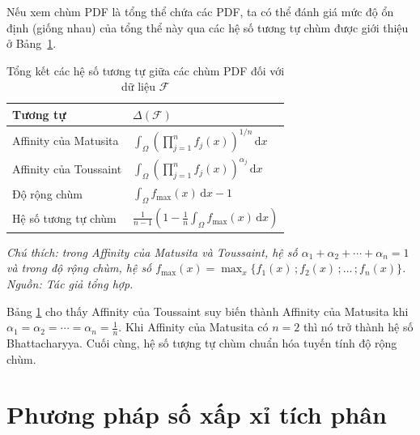 \documentclass[a4paper,oneside]{book} %
\theoremstyle{plain}
\theoremstyle{plain}
\theoremstyle{nonumberplain}
\begin{document}
Nếu xem chùm PDF là tổng thể chứa các PDF, ta có thể đánh giá mức độ ổn định (giống nhau) của tổng thể này qua các hệ số tương tự chùm được giới thiệu ở Bảng~\ref{tab:chumham}.

\begin{table}[H]
	\centering\fontsize{11pt}{14pt}\selectfont
    \caption{Tổng kết các hệ số tương tự giữa các chùm PDF đối với dữ liệu $\mathcal{F}$}\label{tab:chumham}
	\begin{tabular*}{\columnwidth}{@{\extracolsep\fill}ll@{\extracolsep\fill}} 
			\toprule
			\bf Tương tự & \bf                             $\Delta(\mathcal{F})$                             \\ \midrule
            Affinity của Matusita \cite{matusita1967notion} & $\int_{\Omega}\left(\prod_{j=1}^nf_j(x)\right)^{1/n}\mathrm{\,d}x$\\
            Affinity của Toussaint \cite{toussaint1972some} & $\int_{\Omega}\left(\prod_{j=1}^nf_j(x)\right)^{\alpha_j}\mathrm{\,d}x$\\
			Độ rộng chùm \cite{Tai2010} & $\int_\Omega f_{\max}(x)\mathrm{\,d}x -1$\\
			Hệ số tương tự chùm \cite{vovan2018similar}& $\frac{1}{n-1}\left(1-\frac{1}{n}\int_{\Omega}f_{\max}(x)\mathrm{\,d}x\right)$\\
			\bottomrule
		\end{tabular*}
		\begin{minipage}{\textwidth}\fontsize{11pt}{14pt}\selectfont\it
			Chú thích: trong Affinity của Matusita và Toussaint, hệ số $\alpha_1+\alpha_2+\cdots+\alpha_n=1$ và trong độ rộng chùm, hệ số $ f_{\max}(x) = \max_x\{f_1(x)\,;f_2(x)\,;\ldots\,;f_n(x)\}$. Nguồn: Tác giả tổng hợp.
		\end{minipage}
\end{table}

Bảng \ref{tab:chumham} cho thấy Affinity của Toussaint suy biến thành Affinity của Matusita khi $\alpha_1=\alpha_2=\cdots=\alpha_n=\frac{1}{n}$. Khi Affinity của Matusita có $n=2$ thì nó trở thành hệ số Bhattacharyya. Cuối cùng, hệ số tượng tự chùm chuẩn hóa tuyến tính độ rộng chùm.

\section{Phương pháp số xấp xỉ tích phân}
\end{document}

